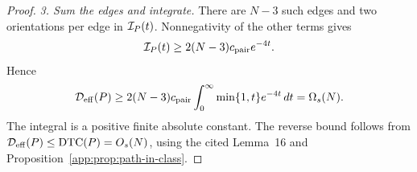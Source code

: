 \begin{proof}
\emph{3. Sum the edges and integrate.}
There are $N-3$ such edges and two orientations per edge in
$\mathcal I_P(t)$. Nonnegativity of the other terms gives
\[
 \mathcal I_P(t)\ge
 2(N-3)c_{\mathrm{pair}}e^{-4t}.
\]
Hence
\[
 \mathcal D_{\mathrm{eff}}(P)\ge
 2(N-3)c_{\mathrm{pair}}
 \int_0^\infty\min\{1,t\}e^{-4t}\,dt
 =\Omega_{s}(N).
\]
The integral is a positive finite absolute constant.
The reverse bound follows from
$\mathcal D_{\mathrm{eff}}(P)\le\mathrm{DTC}(P)=O_{s}(N)$,
using the cited Lemma~16 and Proposition~\ref{app:prop:path-in-class}.
\end{proof}
